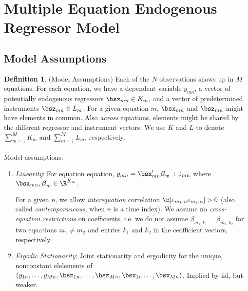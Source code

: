 \documentclass[12pt]{article}
\theoremstyle{plain}
\theoremstyle{definition}
\newtheorem{defn}[thm]{Definition}
\theoremstyle{remark}
\newcommand{\bsbeta}{\boldsymbol{\beta}}
\begin{document}
\clearpage
\section{Multiple Equation Endogenous Regressor Model}

\subsection{Model Assumptions}

\begin{defn}(Model Assumptions)
Each of the $N$ observations shows up in $M$ equations.
For each equation, we have a dependent variable $y_{mn}$, a vector of
potentially endogenous regressors $\bsx_{mn}\in K_m$, and a vector of
predetermined instruments $\bsz_{mn}\in L_m$.
For a given equation $m$, $\bsx_{mn}$
and $\bsz_{mn}$ might have elements in common. Also
\emph{across} equations, elements might be shared by the different
regressor and instrument vectors. We use $K$ and $L$ to denote
$\sum_{m=1}^M K_m$ and $\sum_{m=1}^M L_m$, respectively.
\\
\\
Model assumptions:
\begin{enumerate}
  \item \emph{Linearity}:
    For equation equation,
    $y_{mn} = \bsx_{mn}' \bsbeta_m + \varepsilon_{mn}$
    where $\bsx_{mn},\bsbeta_m\in\R^{K_m}$.

    For a given $n$, we allow \emph{interequation} correlation
    $\E[\varepsilon_{m_1,n}\varepsilon_{m_2,n}]>0$ (also called
    \emph{contemporaneous}, when $n$ is a time index).
    We assume no \emph{cross-equation restrictions} on coefficients,
    i.e. we do not assume $\beta_{m_1,k_1} = \beta_{m_2,k_2}$ for
    two equations $m_1\neq m_2$ and entries $k_1$ and $k_2$ in the
    ceofficient vectors, respectively.

  \item \emph{Ergodic Stationarity}:
    Joint stationarity and ergodicity for the unique, nonconstant
    elelements of
    $(y_{1n},\ldots,y_{Mn},\bsz_{1n},\ldots,\bsz_{Mn},\bsx_{1n}\ldots,\bsx_{Mn})$.
    Implied by iid, but weaker.


\end{enumerate}
\end{defn}
\end{document}
